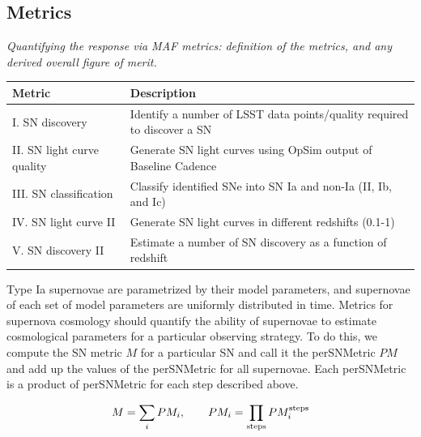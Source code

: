 






\subsection{Metrics}
\label{sec:keyword:metrics}

{\it Quantifying the response via MAF metrics: definition of the metrics,
and any derived overall figure of merit.}
\label{sec:keyword:metrics}

\begin{center}
\begin{tabular}{| p{5cm} |p{10cm}| }
\hline Metric & Description \\
\hline
I. SN discovery  &  Identify a number of LSST data points/quality required to discover a SN  \\
II. SN light curve quality & Generate SN light curves using OpSim output of Baseline Cadence \\
III. SN classification & Classify identified SNe into SN Ia and non-Ia (II, Ib, and Ic)  \\
IV. SN light curve II & Generate SN light curves in different redshifts (0.1-1) \\
V. SN discovery II &  Estimate a number of SN discovery as a function of redshift \\
\hline \end{tabular}
\end{center}


Type Ia supernovae are parametrized by their model parameters, and supernovae of each
set of model parameters are uniformly distributed in time.
Metrics for supernova cosmology should quantify the ability of supernovae 
to estimate cosmological parameters for a particular observing strategy. 
To do this, we compute the SN metric $M$ for a particular SN and call it the 
perSNMetric $PM$ and add up the values of the perSNMetric for all supernovae. 
Each perSNMetric is a product of perSNMetric for each step described above.

\begin{equation}
M = \sum_i PM_i, \qquad PM_i = \prod_{\rm{steps}} PM_i^{\rm{steps}}
\end{equation}

